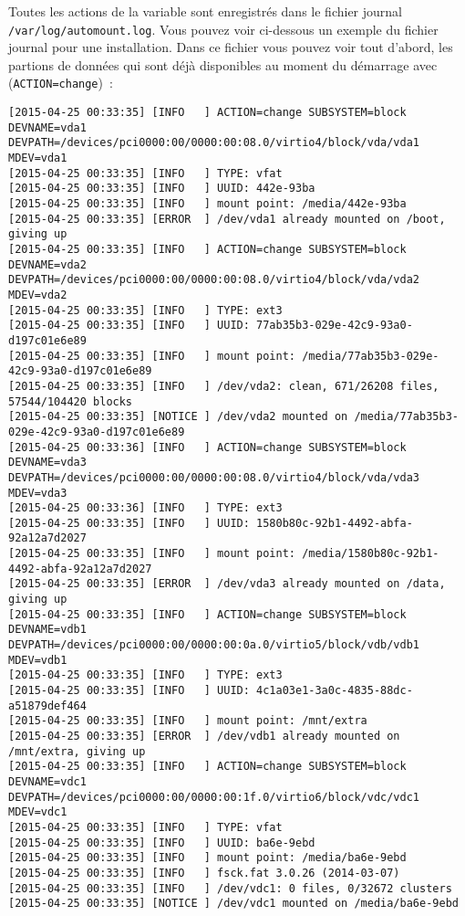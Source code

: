     Toutes les actions de la variable  sont enregistrés dans le
	fichier journal \texttt{/var/log/automount.log}. Vous pouvez voir ci-dessous un exemple
	du fichier journal pour une installation. Dans ce fichier vous pouvez voir tout d'abord,
	les partions de données qui sont déjà disponibles au moment du démarrage avec
	(\texttt{ACTION=change})~:

\begin{tiny}
\begin{verbatim}
[2015-04-25 00:33:35] [INFO   ] ACTION=change SUBSYSTEM=block DEVNAME=vda1 DEVPATH=/devices/pci0000:00/0000:00:08.0/virtio4/block/vda/vda1 MDEV=vda1
[2015-04-25 00:33:35] [INFO   ] TYPE: vfat
[2015-04-25 00:33:35] [INFO   ] UUID: 442e-93ba
[2015-04-25 00:33:35] [INFO   ] mount point: /media/442e-93ba
[2015-04-25 00:33:35] [ERROR  ] /dev/vda1 already mounted on /boot, giving up
[2015-04-25 00:33:35] [INFO   ] ACTION=change SUBSYSTEM=block DEVNAME=vda2 DEVPATH=/devices/pci0000:00/0000:00:08.0/virtio4/block/vda/vda2 MDEV=vda2
[2015-04-25 00:33:35] [INFO   ] TYPE: ext3
[2015-04-25 00:33:35] [INFO   ] UUID: 77ab35b3-029e-42c9-93a0-d197c01e6e89
[2015-04-25 00:33:35] [INFO   ] mount point: /media/77ab35b3-029e-42c9-93a0-d197c01e6e89
[2015-04-25 00:33:35] [INFO   ] /dev/vda2: clean, 671/26208 files, 57544/104420 blocks
[2015-04-25 00:33:35] [NOTICE ] /dev/vda2 mounted on /media/77ab35b3-029e-42c9-93a0-d197c01e6e89
[2015-04-25 00:33:36] [INFO   ] ACTION=change SUBSYSTEM=block DEVNAME=vda3 DEVPATH=/devices/pci0000:00/0000:00:08.0/virtio4/block/vda/vda3 MDEV=vda3
[2015-04-25 00:33:36] [INFO   ] TYPE: ext3
[2015-04-25 00:33:35] [INFO   ] UUID: 1580b80c-92b1-4492-abfa-92a12a7d2027
[2015-04-25 00:33:35] [INFO   ] mount point: /media/1580b80c-92b1-4492-abfa-92a12a7d2027
[2015-04-25 00:33:35] [ERROR  ] /dev/vda3 already mounted on /data, giving up
[2015-04-25 00:33:35] [INFO   ] ACTION=change SUBSYSTEM=block DEVNAME=vdb1 DEVPATH=/devices/pci0000:00/0000:00:0a.0/virtio5/block/vdb/vdb1 MDEV=vdb1
[2015-04-25 00:33:35] [INFO   ] TYPE: ext3
[2015-04-25 00:33:35] [INFO   ] UUID: 4c1a03e1-3a0c-4835-88dc-a51879def464
[2015-04-25 00:33:35] [INFO   ] mount point: /mnt/extra
[2015-04-25 00:33:35] [ERROR  ] /dev/vdb1 already mounted on /mnt/extra, giving up
[2015-04-25 00:33:35] [INFO   ] ACTION=change SUBSYSTEM=block DEVNAME=vdc1 DEVPATH=/devices/pci0000:00/0000:00:1f.0/virtio6/block/vdc/vdc1 MDEV=vdc1
[2015-04-25 00:33:35] [INFO   ] TYPE: vfat
[2015-04-25 00:33:35] [INFO   ] UUID: ba6e-9ebd
[2015-04-25 00:33:35] [INFO   ] mount point: /media/ba6e-9ebd
[2015-04-25 00:33:35] [INFO   ] fsck.fat 3.0.26 (2014-03-07)
[2015-04-25 00:33:35] [INFO   ] /dev/vdc1: 0 files, 0/32672 clusters
[2015-04-25 00:33:35] [NOTICE ] /dev/vdc1 mounted on /media/ba6e-9ebd
\end{verbatim}
\end{tiny}

